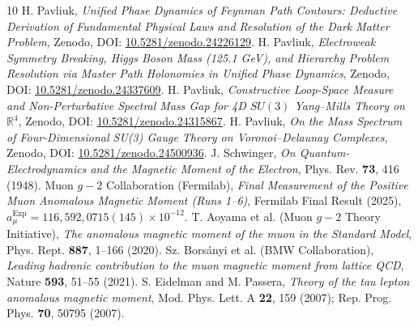 \documentclass[11pt,a4paper]{article}
\begin{document}
\begin{thebibliography}{10}
 H. Pavliuk, \textit{Unified Phase Dynamics of Feynman Path Contours: Deductive Derivation of Fundamental Physical Laws and Resolution of the Dark Matter Problem}, Zenodo, DOI: \href{https://doi.org/10.5281/zenodo.24226129}{10.5281/zenodo.24226129}.
 H. Pavliuk, \textit{Electroweak Symmetry Breaking, Higgs Boson Mass (125.1 GeV), and Hierarchy Problem Resolution via Master Path Holonomies in Unified Phase Dynamics}, Zenodo, DOI: \href{https://doi.org/10.5281/zenodo.24337609}{10.5281/zenodo.24337609}.
 H. Pavliuk, \textit{Constructive Loop-Space Measure and Non-Perturbative Spectral Mass Gap for 4D $SU(3)$ Yang--Mills Theory on $\mathbb{R}^4$}, Zenodo, DOI: \href{https://doi.org/10.5281/zenodo.24315867}{10.5281/zenodo.24315867}.
 H. Pavliuk, \textit{On the Mass Spectrum of Four-Dimensional SU(3) Gauge Theory on Voronoi--Delaunay Complexes}, Zenodo, DOI: \href{https://doi.org/10.5281/zenodo.24500936}{10.5281/zenodo.24500936}.
 J. Schwinger, \textit{On Quantum-Electrodynamics and the Magnetic Moment of the Electron}, Phys. Rev. \textbf{73}, 416 (1948).
 Muon $g-2$ Collaboration (Fermilab), \textit{Final Measurement of the Positive Muon Anomalous Magnetic Moment (Runs 1--6)}, Fermilab Final Result (2025), $a_\mu^{\mathrm{Exp}} = 116,592,0715(145) \times 10^{-12}$.
 T. Aoyama et al. (Muon $g-2$ Theory Initiative), \textit{The anomalous magnetic moment of the muon in the Standard Model}, Phys. Rept. \textbf{887}, 1--166 (2020).
 Sz. Bors\'anyi et al. (BMW Collaboration), \textit{Leading hadronic contribution to the muon magnetic moment from lattice QCD}, Nature \textbf{593}, 51--55 (2021).
 S. Eidelman and M. Passera, \textit{Theory of the tau lepton anomalous magnetic moment}, Mod. Phys. Lett. A \textbf{22}, 159 (2007); Rep. Prog. Phys. \textbf{70}, 50795 (2007).
\end{thebibliography}
\end{document}
